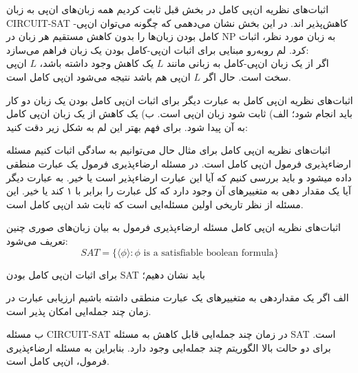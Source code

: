 \begin{itemframe}{اثبات‌های نظریه ان‌پی کامل}
\itm
در بخش قبل ثابت کردیم همه زبان‌های ان‌پی به زبان CIRCUIT-SAT کاهش‌پذیر اند.
\itm
در این بخش نشان می‌دهمی که چگونه می‌توان ان‌پی-کامل بودن زبان‌ها را بدون کاهش مستقیم هر زبان در NP به زبان مورد نظر، اثبات کرد.
\itm
لم روبه‌رو مبنایی برای اثبات ان‌پی-کامل بودن یک زبان فراهم می‌سازد:\\
اگر از یک زبان ان‌پی-کامل به زبانی مانند $L$ یک کاهش وجود داشته باشد، $L$ ان‌پی سخت است. حال اگر $L$ ان‌پی هم باشد نتیجه می‌شود ان‌پی کامل است.
\end{itemframe}

\begin{itemframe}{اثبات‌های نظریه ان‌پی کامل}
\itm
به عبارت دیگر برای اثبات ان‌پی کامل بودن یک زبان دو کار باید انجام شود؛‌ الف) ثابت شود زبان ان‌پی است. ب) یک کاهش از یک زبان ان‌پی کامل به آن پیدا شود.
\itm
برای فهم بهتر این لم به شکل زیر دقت کنید:
\end{itemframe}

\begin{itemframe}{اثبات‌های نظریه ان‌پی کامل}
\itm
برای مثال حال می‌توانیم به سادگی اثبات کنیم مسئله ارضاء‌پذیری فرمول
ان‌پی کامل است.
\itm
در مسئله ارضاءپذیری فرمول یک عبارت منطقی داده میشود و‌ باید بررسی کنیم که آیا این عبارت ارضاءپذیر است یا خیر. به عبارت دیگر آیا یک مقدار دهی به متغییرهای آن وجود دارد که کل عبارت را برابر با ۱ کند یا خیر.
\itm
این مسئله از نظر تاریخی اولین مسئله‌ایی است که ثابت شد ان‌پی کامل است.
\end{itemframe}

\begin{itemframe}{اثبات‌های نظریه ان‌پی کامل}
\itm
مسئله ارضاءپذیری فرمول به بیان زبان‌های صوری چنین تعریف می‌شود:
$$
SAT = \{\langle  \phi \rangle: \phi \text{ is a satisfiable boolean formula}\}
$$

\itm
برای اثبات ان‌پی کامل بودن SAT باید نشان دهیم؛
\item[الف]
اگر یک مقداردهی به متغییر‌های یک عبارت منطقی داشته باشیم ارزیابی عبارت در زمان چند جمله‌ایی امکان پذیر است.
\item[ب]
مسئله CIRCUIT-SAT در زمان چند جمله‌ایی قابل کاهش به مسئله SAT است.
\itm
برای دو حالت بالا الگوریتم چند جمله‌ایی وجود دارد. بنابراین به مسئله ارضاءپذیری فرمول، ان‌پی کامل است.
\end{itemframe}

